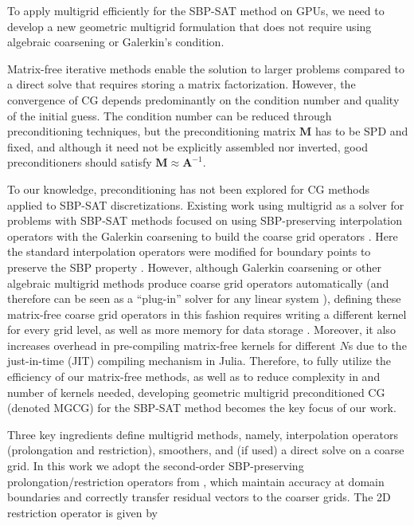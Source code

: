 To apply multigrid efficiently for the SBP-SAT method on GPUs, we need to develop a new geometric multigrid formulation that does not require using algebraic coarsening or Galerkin's condition.

Matrix-free iterative methods enable the solution to larger problems compared to a direct solve that requires storing a matrix factorization.  However, the convergence of CG depends predominantly on the condition number and quality of the initial guess. The condition number can be reduced through preconditioning techniques, but the preconditioning matrix $\mathbf{M}$ has to be SPD and fixed, and although it need not be explicitly assembled nor inverted, good preconditioners should satisfy $\mathbf{M} \approx \mathbf{A}^{-1}$. 


To our knowledge, preconditioning has not been explored for CG methods applied to SBP-SAT discretizations. 
Existing work using multigrid as a solver for problems with SBP-SAT methods focused on using SBP-preserving interpolation operators with the Galerkin coarsening to build the coarse grid operators \citep{RUGGIU2018216}. Here the standard interpolation operators were modified for boundary points to preserve the SBP property \citep{RUGGIU2018216}. However, although Galerkin coarsening or other algebraic multigrid methods produce coarse grid operators automatically (and therefore can be seen as a ``plug-in'' solver for any linear system \citep{stuben2001review}), defining these matrix-free coarse grid operators in this fashion requires writing a different kernel for every grid level, as well as more memory for data storage \citep{brandt2006guide}. 
Moreover, it also increases overhead in pre-compiling matrix-free kernels for different $N$s due to the just-in-time (JIT) compiling mechanism in Julia. Therefore, to fully utilize the efficiency of our matrix-free methods, as well as to reduce complexity in and number of kernels needed, developing geometric multigrid preconditioned CG (denoted MGCG) for the SBP-SAT method becomes the key focus of our work. 

Three key ingredients define multigrid methods, namely, interpolation operators (prolongation and restriction), smoothers, and (if used) a direct solve on a coarse grid.  In this work we adopt the second-order SBP-preserving prolongation/restriction operators from \citep{RUGGIU2018216}, which maintain accuracy at domain boundaries and correctly transfer residual vectors to the coarser grids. The 2D restriction operator is given by

